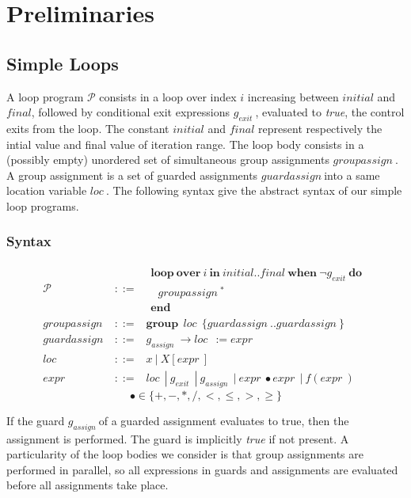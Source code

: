 \documentclass[a4paper,10pt]{article}
\newcommand{\prog}{\ensuremath{\mathcal{P}}\xspace}
\newcommand{\idx}{\ensuremath{i}\xspace}
\newcommand{\idxinitial}{\ensuremath{\mathit{initial}}\xspace}
\newcommand{\idxfinal}{\ensuremath{\mathit{final}}\xspace}
\newcommand{\KWloop}{\ensuremath{\mathrm{\textbf{loop}}~}}
\newcommand{\KWwhen}{\ensuremath{\mathrm{\textbf{when}}~}}
\newcommand{\KWdo}{\ensuremath{\mathrm{\textbf{do}}~}}
\newcommand{\KWend}{\ensuremath{\mathrm{\textbf{end}}~}}
\newcommand{\KWover}{\ensuremath{\mathrm{\textbf{over}}~}}
\newcommand{\KWin}{\ensuremath{~\mathrm{\textbf{in}}~}}
\newcommand{\KWgroup}{\ensuremath{\mathrm{\textbf{group}}~}}
\newcommand{\groupassign}{\ensuremath{\mathit{groupassign}~}}
\newcommand{\guardassign}{\ensuremath{\mathit{guardassign}~}}
\newcommand{\gexit}{\ensuremath{\mathit{g_{exit}~}}}
\newcommand{\gassign}{\ensuremath{\mathit{g_{assign}~}}}
\newcommand{\expr}{\ensuremath{\mathit{expr~}}}
\newcommand{\loc}{\ensuremath{\mathit{loc}~}}
\begin{document}
\section{Preliminaries}

\subsection{Simple Loops}
\label{sec:simple-loops}
A loop program \prog consists in a loop over index \idx increasing between \idxinitial 
and \idxfinal, followed by conditional exit expressions \gexit, evaluated to \textit{true},
the control exits from the loop. The constant \idxinitial and \idxfinal represent 
respectively the intial value and final value of iteration range. The loop body consists
in a (possibly empty) unordered set of simultaneous group assignments \groupassign.
A group assignment is a set of guarded assignments \guardassign into a same location variable \loc. 
The following syntax give the abstract syntax of our simple loop programs. 
\subsubsection*{Syntax}
\begin{eqnarray*}
\prog & ::= & \begin{array}{l}
               \KWloop \KWover \idx \KWin \idxinitial ..\idxfinal ~ \KWwhen \neg \gexit \KWdo\\
               ~~~ \groupassign^*\\
               \KWend
              \end{array}\\
\groupassign & ::= & \KWgroup ~ \loc ~ \{\guardassign .. \guardassign \}\\
\guardassign  & ::= & \gassign \rightarrow \loc ~:=  \expr\\
\loc  & ::= & x ~|~ X[\expr] \\
\expr  & ::= & \loc  ~|~ \gexit ~|~ \gassign ~|~ \expr \bullet \expr  ~|~ f(\expr)
\end{eqnarray*}
$$\bullet \in \{+, -, *, / , <, \leq, >, \geq \}$$

If the guard \gassign of a guarded assignment evaluates to true, then the
assignment is performed. The guard is implicitly \textit{true} if not present.
A particularity of the loop bodies we consider is that group assignments
are performed in parallel, so all expressions in guards and assignments are
evaluated before all assignments take place.
   
\end{document}
